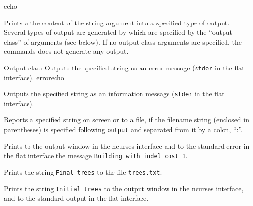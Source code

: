 \begin{command}{echo}{}

	
	\begin{poydescription} 
         Prints a the content of the string argument into a specified type of output.
         Several types of output are generated by \poy  which are specified by the
         ``output class'' of arguments (see below). If no output-class arguments are
         specified, the commands does not generate any output.
	\end{poydescription}

    \begin{arguments}
           \begin{argumentgroup}{Output class}
            {Outputs the specified string as an error message (\texttt{stder} in the
            flat interface).}
            {errorecho}

            {Outputs the specified string as an information message (\texttt{stder} in the
            flat interface).}
            {}

            {Reports a specified string on screen or to a file, if the filename string (enclosed in
            parentheses) is specified following \texttt{output} and separated from it by
            a colon, ``:''.}
            {}
           \end{argumentgroup}
    \end{arguments}

	\begin{poyexamples}

            {Prints to the output window in the ncurses interface and to the
            standard error in the flat interface the message \texttt
{Building with indel cost 1}.}

            {Prints the string \texttt{Final trees} to the file \texttt{trees.txt}.}

            {Prints the string \texttt{Initial trees} to the output window in the
            ncurses interface, and to the standard output in the flat
            interface.}
    \end{poyexamples}

	\begin{poyalso}
	\end{poyalso}

\end{command}

